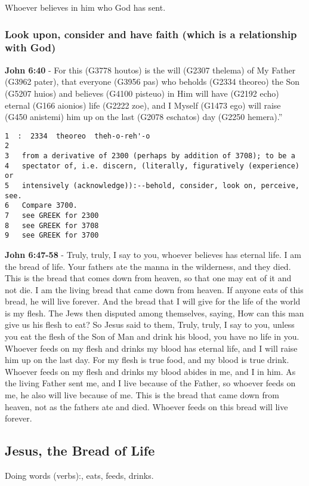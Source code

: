 \documentclass[11pt]{article}
\begin{document}
Whoever believes in him who God has sent.

\subsubsection{Look upon, consider and have faith (which is a relationship with God)}
\label{sec:orgb45e243}
\textbf{John 6:40} - For this (G3778 houtos) is the will (G2307 thelema) of My Father (G3962 pater), that everyone (G3956 pas) who beholds (G2334 theoreo) the Son (G5207 huios) and believes (G4100 pisteuo) in Him will have (G2192 echo) eternal (G166 aionios) life (G2222 zoe), and I Myself (G1473 ego) will raise (G450 anistemi) him up on the last (G2078 eschatos) day (G2250 hemera).”

\begin{verbatim}
1  :  2334  theoreo  theh-o-reh'-o
2  
3   from a derivative of 2300 (perhaps by addition of 3708); to be a
4   spectator of, i.e. discern, (literally, figuratively (experience) or
5   intensively (acknowledge)):--behold, consider, look on, perceive, see.
6   Compare 3700.
7   see GREEK for 2300
8   see GREEK for 3708
9   see GREEK for 3700
\end{verbatim}

\textbf{John 6:47-58} - Truly, truly, I say to you, whoever believes has eternal life. I am the bread of life. Your fathers ate the manna in the wilderness, and they died. This is the bread that comes down from heaven, so that one may eat of it and not die. I am the living bread that came down from heaven. If anyone eats of this bread, he will live forever. And the bread that I will give for the life of the world is my flesh. The Jews then disputed among themselves, saying, How can this man give us his flesh to eat? So Jesus said to them, Truly, truly, I say to you, unless you eat the flesh of the Son of Man and drink his blood, you have no life in you. Whoever feeds on my flesh and drinks my blood has eternal life, and I will raise him up on the last day. For my flesh is true food, and my blood is true drink. Whoever feeds on my flesh and drinks my blood abides in me, and I in him. As the living Father sent me, and I live because of the Father, so whoever feeds on me, he also will live because of me. This is the bread that came down from heaven, not as the fathers ate and died. Whoever feeds on this bread will live forever.

\subsection{Jesus, the Bread of Life}
\label{sec:org45a4aa6}
Doing words (verbs):, eats, feeds, drinks.
\end{document}

